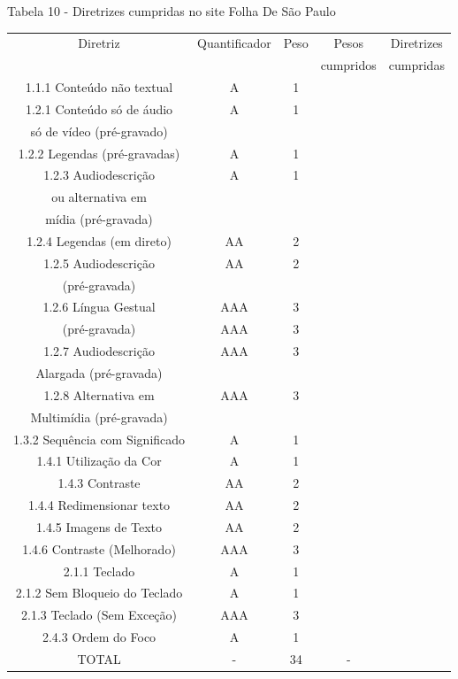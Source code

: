 \documentclass[a4paper]{article}
\begin{document}
\begin{titlepage}
Tabela 10 - Diretrizes cumpridas no site Folha De São Paulo\\[-1cm]
\begin{center}
	\fontsize{8pt}{8pt}\selectfont	
	\begin{longtable}{|c|c|c|c|c|}
		\hline
		Diretriz & Quantificador & Peso & Pesos & Diretrizes\\
		& & & cumpridos & cumpridas\\
		\hline
		1.1.1 Conteúdo não textual & A & 1 & & \\
		\hline
		1.2.1 Conteúdo só de áudio & A & 1 & & \\
		só de vídeo (pré-gravado) & & & & \\
		\hline
		1.2.2 Legendas (pré-gravadas) & A & 1 & & \\
		\hline
		1.2.3 Audiodescrição & A & 1 & & \\
		ou alternativa em & & & & \\
		mídia (pré-gravada) & & & & \\
		\hline
		1.2.4 Legendas (em direto) & AA & 2 & & \\
		\hline
		1.2.5 Audiodescrição & AA & 2 & & \\
		(pré-gravada) & & & & \\
		\hline
		1.2.6 Língua Gestual & AAA & 3 & & \\
		(pré-gravada) & AAA & 3 & & \\
		\hline
		1.2.7 Audiodescrição & AAA & 3 & & \\
		Alargada (pré-gravada) & & & & \\
		\hline
		1.2.8 Alternativa em & AAA & 3 & & \\
		Multimídia (pré-gravada) & & & & \\
		\hline
		1.3.2 Sequência com Significado & A & 1 & & \\
		\hline
		1.4.1 Utilização da Cor & A & 1 & & \\
		\hline
		1.4.3 Contraste & AA & 2 & & \\
		\hline
		1.4.4 Redimensionar texto & AA & 2 & & \\
		\hline
		1.4.5 Imagens de Texto & AA & 2 & & \\
		\hline
		1.4.6 Contraste (Melhorado) & AAA & 3 & & \\
		\hline
		2.1.1 Teclado & A & 1 & & \\
		\hline
		2.1.2 Sem Bloqueio do Teclado & A & 1 & & \\
		\hline
		2.1.3 Teclado (Sem Exceção) & AAA & 3 & & \\
		\hline
		2.4.3 Ordem do Foco & A & 1 & & \\
		\hline
		TOTAL & - & 34 & - & \\
		\hline
	\end{longtable}
\end{center}


\end{titlepage}
\end{document}
